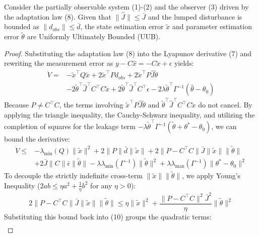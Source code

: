 \documentclass[letterpaper, 10 pt, conference]{ieeeconf}  %
\begin{document}
\begin{theorem}
Consider the partially observable system (1)-(2) and the observer (3) driven by the adaptation law (8). Given that $\|\hat{J}\| \le \bar{J}$ and the lumped disturbance is bounded as $\|d_{obs}\| \le \bar{d}$, the state estimation error $\tilde{x}$ and parameter estimation error $\tilde{\theta}$ are Uniformly Ultimately Bounded (UUB).
\end{theorem}
\begin{proof}
Substituting the adaptation law (8) into the Lyapunov derivative (7) and rewriting the measurement error as $y - C\hat{x} = -C\tilde{x} + \epsilon$ yields:
\begin{align}
    \dot{V} = &-\tilde{x}^\top Q \tilde{x} + 2\tilde{x}^\top P d_{obs} + 2\tilde{x}^\top P \hat{J} \tilde{\theta} \nonumber \\
    &- 2\tilde{\theta}^\top \hat{J}^\top C^\top C \tilde{x} + 2\tilde{\theta}^\top \hat{J}^\top C^\top \epsilon - 2\lambda \tilde{\theta}^\top \Gamma^{-1} (\hat{\theta} - \theta_0)
\end{align}
Because $P \neq C^\top C$, the terms involving $\tilde{x}^\top P \hat{J} \tilde{\theta}$ and $\tilde{\theta}^\top \hat{J}^\top C^\top C \tilde{x}$ do not cancel. By applying the triangle inequality, the Cauchy-Schwarz inequality, and utilizing the completion of squares for the leakage term $-\lambda \tilde{\theta}^\top \Gamma^{-1} (\tilde{\theta} + \theta^* - \theta_0)$, we can bound the derivative:
\begin{align}
    \dot{V} \le &-\lambda_{\min}(Q) \|\tilde{x}\|^2 + 2 \|P\| \bar{d} \|\tilde{x}\| + 2 \|P - C^\top C\| \bar{J} \|\tilde{x}\| \|\tilde{\theta}\| \nonumber \\
    &+ 2 \bar{J} \|C\| \bar{\epsilon} \|\tilde{\theta}\| - \lambda \lambda_{\min}(\Gamma^{-1}) \|\tilde{\theta}\|^2 + \lambda \lambda_{\max}(\Gamma^{-1}) \|\theta^* - \theta_0\|^2
\end{align}
To decouple the strictly indefinite cross-term $\|\tilde{x}\| \|\tilde{\theta}\|$, we apply Young's Inequality ($2ab \le \eta a^2 + \frac{1}{\eta} b^2$ for any $\eta > 0$):
\begin{equation}
    2 \|P - C^\top C\| \bar{J} \|\tilde{x}\| \|\tilde{\theta}\| \le \eta \|\tilde{x}\|^2 + \frac{\|P - C^\top C\|^2 \bar{J}^2}{\eta} \|\tilde{\theta}\|^2
\end{equation}
Substituting this bound back into (10) groups the quadratic terms:
\begin{align}

\end{align}
\end{proof}
\end{document}
